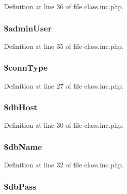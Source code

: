 \-Definition at line 36 of file class.\-inc.\-php.

\hypertarget{class_site_setup_a4834809991e0ed92ae0e330d1a266d88}{
\subsubsection[{\$admin\-User}]{\setlength{\rightskip}{0pt plus 5cm}\${\bf admin\-User}}}\label{class_site_setup_a4834809991e0ed92ae0e330d1a266d88}


\-Definition at line 35 of file class.\-inc.\-php.

\hypertarget{class_site_setup_ac0be44947885dd1b40498b12201d16a0}{
\subsubsection[{\$conn\-Type}]{\setlength{\rightskip}{0pt plus 5cm}\$conn\-Type}}\label{class_site_setup_ac0be44947885dd1b40498b12201d16a0}


\-Definition at line 27 of file class.\-inc.\-php.

\hypertarget{class_site_setup_ad0ddb2725e69c88a729e0cc242a1b2a6}{
\subsubsection[{\$db\-Host}]{\setlength{\rightskip}{0pt plus 5cm}\$db\-Host}}\label{class_site_setup_ad0ddb2725e69c88a729e0cc242a1b2a6}


\-Definition at line 30 of file class.\-inc.\-php.

\hypertarget{class_site_setup_a68f39949e76b64662a06cb56579d91c3}{
\subsubsection[{\$db\-Name}]{\setlength{\rightskip}{0pt plus 5cm}\$db\-Name}}\label{class_site_setup_a68f39949e76b64662a06cb56579d91c3}


\-Definition at line 32 of file class.\-inc.\-php.

\hypertarget{class_site_setup_a30d808caf55f524798c6a5aaafd633ad}{
\subsubsection[{\$db\-Pass}]{\setlength{\rightskip}{0pt plus 5cm}\$db\-Pass}}\label{class_site_setup_a30d808caf55f524798c6a5aaafd633ad}


